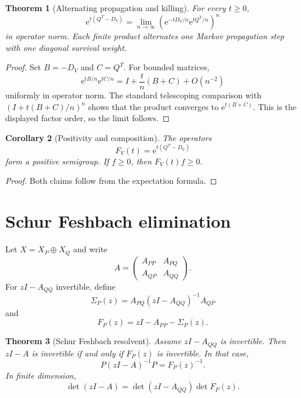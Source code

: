 \documentclass[11pt,a4paper]{article}
\newtheorem{theorem}{Theorem}[section]
\newtheorem{corollary}[theorem]{Corollary}
\theoremstyle{definition}
\theoremstyle{remark}
\newcommand{\e}{\mathrm e}
\begin{document}
\begin{theorem}[Alternating propagation and killing]\label{extended:record:083}\label{extended:thm:feynman_kac_product}
For every \(t\geq0\),
\[
\e^{t(Q^T-D_V)}
=
\lim_{n\to\infty}
\left(
\e^{-tD_V/n}\e^{tQ^T/n}
\right)^n
\]
in operator norm. Each finite product alternates one Markov propagation step with one diagonal survival weight.
\end{theorem}

\begin{proof}
Set \(B=-D_V\) and \(C=Q^T\). For bounded matrices,
\[
\e^{tB/n}\e^{tC/n}
=
I+\frac{t}{n}(B+C)+O(n^{-2})
\]
uniformly in operator norm. The standard telescoping comparison with
\(
(I+t(B+C)/n)^n
\)
shows that the product converges to \(\e^{t(B+C)}\). This is the displayed factor order, so the limit follows.
\end{proof}

\begin{corollary}[Positivity and composition]\label{extended:record:084}\label{extended:cor:feynman_kac_semigroup}
The operators
\[
F_V(t)=\e^{t(Q^T-D_V)}
\]
form a positive semigroup. If \(f\geq0\), then \(F_V(t)f\geq0\).
\end{corollary}

\begin{proof}
Both claims follow from the expectation formula.
\end{proof}

\section{Schur Feshbach elimination}\label{extended:section:14}\label{extended:sec:feshbach}

Let \(X=X_P\oplus X_Q\) and write
\[
A=
\begin{pmatrix}
A_{PP}&A_{PQ}\\
A_{QP}&A_{QQ}
\end{pmatrix}.
\]
For \(zI-A_{QQ}\) invertible, define
\[
\Sigma_P(z)
=
A_{PQ}(zI-A_{QQ})^{-1}A_{QP}
\]
and
\[
F_P(z)
=
zI-A_{PP}-\Sigma_P(z).
\]

\begin{theorem}[Schur Feshbach resolvent]\label{extended:record:085}\label{extended:thm:feshbach_resolvent}
Assume \(zI-A_{QQ}\) is invertible. Then \(zI-A\) is invertible if and only if \(F_P(z)\) is invertible. In that case,
\[
P(zI-A)^{-1}P
=
F_P(z)^{-1}.
\]
In finite dimension,
\[
\det(zI-A)
=
\det(zI-A_{QQ})\det F_P(z).
\]
\end{theorem}
\end{document}
